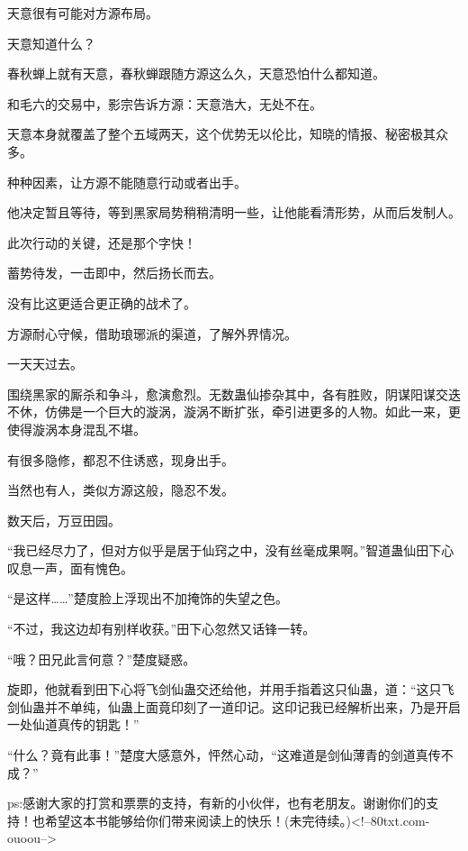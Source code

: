 \begin{this_body}
天意很有可能对方源布局。

天意知道什么？

春秋蝉上就有天意，春秋蝉跟随方源这么久，天意恐怕什么都知道。

和毛六的交易中，影宗告诉方源：天意浩大，无处不在。

天意本身就覆盖了整个五域两天，这个优势无以伦比，知晓的情报、秘密极其众多。

种种因素，让方源不能随意行动或者出手。

他决定暂且等待，等到黑家局势稍稍清明一些，让他能看清形势，从而后发制人。

此次行动的关键，还是那个字快！

蓄势待发，一击即中，然后扬长而去。

没有比这更适合更正确的战术了。

方源耐心守候，借助琅琊派的渠道，了解外界情况。

一天天过去。

围绕黑家的厮杀和争斗，愈演愈烈。无数蛊仙掺杂其中，各有胜败，阴谋阳谋交迭不休，仿佛是一个巨大的漩涡，漩涡不断扩张，牵引进更多的人物。如此一来，更使得漩涡本身混乱不堪。

有很多隐修，都忍不住诱惑，现身出手。

当然也有人，类似方源这般，隐忍不发。

数天后，万豆田园。

“我已经尽力了，但对方似乎是居于仙窍之中，没有丝毫成果啊。”智道蛊仙田下心叹息一声，面有愧色。

“是这样……”楚度脸上浮现出不加掩饰的失望之色。

“不过，我这边却有别样收获。”田下心忽然又话锋一转。

“哦？田兄此言何意？”楚度疑惑。

旋即，他就看到田下心将飞剑仙蛊交还给他，并用手指着这只仙蛊，道：“这只飞剑仙蛊并不单纯，仙蛊上面竟印刻了一道印记。这印记我已经解析出来，乃是开启一处仙道真传的钥匙！”

“什么？竟有此事！”楚度大感意外，怦然心动，“这难道是剑仙薄青的剑道真传不成？”

ps:感谢大家的打赏和票票的支持，有新的小伙伴，也有老朋友。谢谢你们的支持！也希望这本书能够给你们带来阅读上的快乐！(未完待续。)<!--80txt.com-ouoou-->

\end{this_body}

